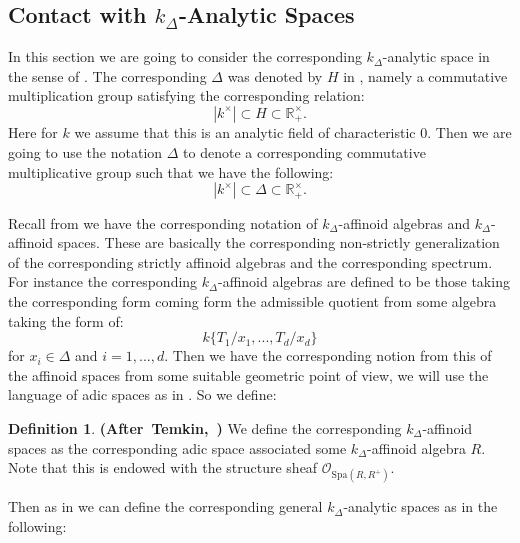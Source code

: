 \documentclass[12pt]{amsart}
\theoremstyle{definition}
\newtheorem{definition}[theorem]{Definition}
\numberwithin{equation}{section}
\begin{document}
\subsection{Contact with $k_\Delta$-Analytic Spaces}


\indent In this section we are going to consider the corresponding $k_\Delta$-analytic space in the sense of \cite[Part I Chapter I]{DFN}. The corresponding $\Delta$ was denoted by $H$ in \cite[Part I Chapter I]{DFN}, namely a commutative multiplication group satisfying the corresponding relation:
\begin{displaymath}
|k^\times|\subset H \subset \mathbb{R}^\times_+.	
\end{displaymath}
Here for $k$ we assume that this is an analytic field of characteristic $0$. Then we are going to use the notation $\Delta$ to denote a corresponding commutative multiplicative group such that we have the following:
\begin{displaymath}
|k^\times|\subset \Delta \subset \mathbb{R}^\times_+.	
\end{displaymath}


\indent Recall from \cite[Part I Chapter I.3]{DFN} we have the corresponding notation of $k_\Delta$-affinoid algebras and $k_\Delta$-affinoid spaces. These are basically the corresponding non-strictly generalization of the corresponding strictly affinoid algebras and the corresponding spectrum. For instance the corresponding $k_\Delta$-affinoid algebras are defined to be those taking the corresponding form coming form the admissible quotient from some algebra taking the form of:
\begin{displaymath}
k\{T_1/x_1,...,T_d/x_d\}	
\end{displaymath}
for $x_i\in \Delta$ and $i=1,...,d$. Then we have the corresponding notion from this of the affinoid spaces from some suitable geometric point of view, we will use the language of adic spaces as in \cite{KL16}. So we define:

\begin{definition}\mbox{\bf{(After Temkin, \cite[Part I Chapter I.3]{DFN})}}
We define the corresponding $k_\Delta$-affinoid spaces as the corresponding adic space associated some $k_\Delta$-affinoid algebra $R$. Note that this is endowed with the structure sheaf $\mathcal{O}_{\mathrm{Spa}(R,R^+)}$. 
\end{definition}



\indent Then as in \cite[Part I Chapter I]{DFN} we can define the corresponding general $k_\Delta$-analytic spaces as in the following:
\end{document}

